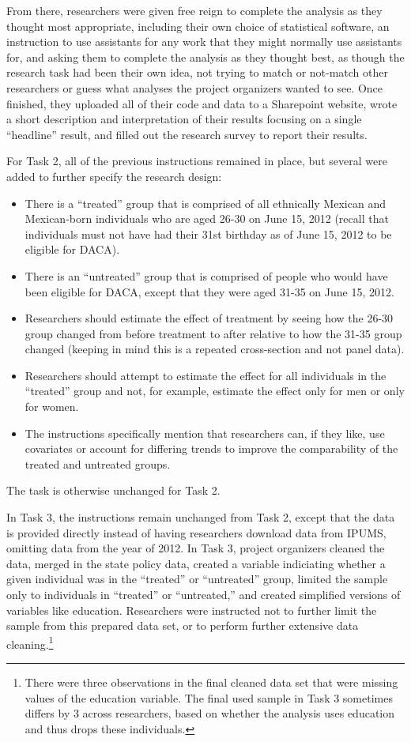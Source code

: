 \documentclass[
  letterpaper,
  DIV=11,
  numbers=noendperiod]{scrartcl}
\begin{document}
From there, researchers were given free reign to complete the analysis
as they thought most appropriate, including their own choice of
statistical software, an instruction to use assistants for any work that
they might normally use assistants for, and asking them to complete the
analysis as they thought best, as though the research task had been
their own idea, not trying to match or not-match other researchers or
guess what analyses the project organizers wanted to see. Once finished,
they uploaded all of their code and data to a Sharepoint website, wrote
a short description and interpretation of their results focusing on a
single ``headline'' result, and filled out the research survey to report
their results.

For Task 2, all of the previous instructions remained in place, but
several were added to further specify the research design:

\begin{itemize}
\item
  There is a ``treated'' group that is comprised of all ethnically
  Mexican and Mexican-born individuals who are aged 26-30 on June 15,
  2012 (recall that individuals must not have had their 31st birthday as
  of June 15, 2012 to be eligible for DACA).
\item
  There is an ``untreated'' group that is comprised of people who would
  have been eligible for DACA, except that they were aged 31-35 on June
  15, 2012.
\item
  Researchers should estimate the effect of treatment by seeing how the
  26-30 group changed from before treatment to after relative to how the
  31-35 group changed (keeping in mind this is a repeated cross-section
  and not panel data).
\item
  Researchers should attempt to estimate the effect for all individuals
  in the ``treated'' group and not, for example, estimate the effect
  only for men or only for women.
\item
  The instructions specifically mention that researchers can, if they
  like, use covariates or account for differing trends to improve the
  comparability of the treated and untreated groups.
\end{itemize}

The task is otherwise unchanged for Task 2.

In Task 3, the instructions remain unchanged from Task 2, except that
the data is provided directly instead of having researchers download
data from IPUMS, omitting data from the year of 2012. In Task 3, project
organizers cleaned the data, merged in the state policy data, created a
variable indiciating whether a given individual was in the ``treated''
or ``untreated'' group, limited the sample only to individuals in
``treated'' or ``untreated,'' and created simplified versions of
variables like education. Researchers were instructed not to further
limit the sample from this prepared data set, or to perform further
extensive data cleaning.\footnote{There were three observations in the
  final cleaned data set that were missing values of the education
  variable. The final used sample in Task 3 sometimes differs by 3
  across researchers, based on whether the analysis uses education and
  thus drops these individuals.}
\end{document}
